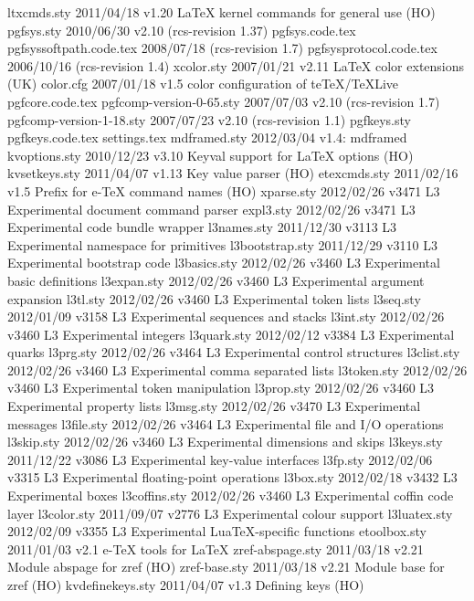  ltxcmds.sty    2011/04/18 v1.20 LaTeX kernel commands for general use (HO)
  pgfsys.sty    2010/06/30 v2.10 (rcs-revision 1.37)
  pgfsys.code.tex
pgfsyssoftpath.code.tex    2008/07/18  (rcs-revision 1.7)
pgfsysprotocol.code.tex    2006/10/16  (rcs-revision 1.4)
  xcolor.sty    2007/01/21 v2.11 LaTeX color extensions (UK)
   color.cfg    2007/01/18 v1.5 color configuration of teTeX/TeXLive
 pgfcore.code.tex
pgfcomp-version-0-65.sty    2007/07/03 v2.10 (rcs-revision 1.7)
pgfcomp-version-1-18.sty    2007/07/23 v2.10 (rcs-revision 1.1)
 pgfkeys.sty    
 pgfkeys.code.tex
settings.tex
mdframed.sty    2012/03/04 v1.4: mdframed
kvoptions.sty    2010/12/23 v3.10 Keyval support for LaTeX options (HO)
kvsetkeys.sty    2011/04/07 v1.13 Key value parser (HO)
etexcmds.sty    2011/02/16 v1.5 Prefix for e-TeX command names (HO)
  xparse.sty    2012/02/26 v3471 L3 Experimental document command parser
   expl3.sty    2012/02/26 v3471 L3 Experimental code bundle wrapper
 l3names.sty    2011/12/30 v3113 L3 Experimental namespace for primitives
l3bootstrap.sty    2011/12/29 v3110 L3 Experimental bootstrap code
l3basics.sty    2012/02/26 v3460 L3 Experimental basic definitions
 l3expan.sty    2012/02/26 v3460 L3 Experimental argument expansion
    l3tl.sty    2012/02/26 v3460 L3 Experimental token lists
   l3seq.sty    2012/01/09 v3158 L3 Experimental sequences and stacks
   l3int.sty    2012/02/26 v3460 L3 Experimental integers
 l3quark.sty    2012/02/12 v3384 L3 Experimental quarks
   l3prg.sty    2012/02/26 v3464 L3 Experimental control structures
 l3clist.sty    2012/02/26 v3460 L3 Experimental comma separated lists
 l3token.sty    2012/02/26 v3460 L3 Experimental token manipulation
  l3prop.sty    2012/02/26 v3460 L3 Experimental property lists
   l3msg.sty    2012/02/26 v3470 L3 Experimental messages
  l3file.sty    2012/02/26 v3464 L3 Experimental file and I/O operations
  l3skip.sty    2012/02/26 v3460 L3 Experimental dimensions and skips
  l3keys.sty    2011/12/22 v3086 L3 Experimental key-value interfaces
    l3fp.sty    2012/02/06 v3315 L3 Experimental floating-point operations
   l3box.sty    2012/02/18 v3432 L3 Experimental boxes
l3coffins.sty    2012/02/26 v3460 L3 Experimental coffin code layer
 l3color.sty    2011/09/07 v2776 L3 Experimental colour support
l3luatex.sty    2012/02/09 v3355 L3 Experimental LuaTeX-specific functions
etoolbox.sty    2011/01/03 v2.1 e-TeX tools for LaTeX
zref-abspage.sty    2011/03/18 v2.21 Module abspage for zref (HO)
zref-base.sty    2011/03/18 v2.21 Module base for zref (HO)
kvdefinekeys.sty    2011/04/07 v1.3 Defining keys (HO)
